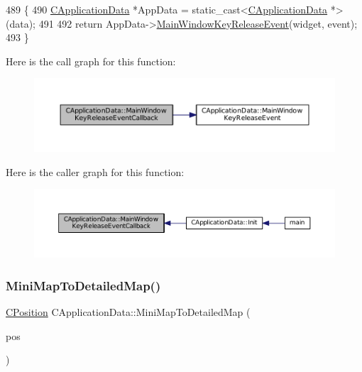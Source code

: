 \begin{DoxyCode}
489                                                                                                            
           \{
490     \hyperlink{classCApplicationData}{CApplicationData} *AppData = \textcolor{keyword}{static\_cast<}\hyperlink{classCApplicationData}{CApplicationData} *\textcolor{keyword}{>}(data);
491 
492     \textcolor{keywordflow}{return} AppData->\hyperlink{classCApplicationData_aff9f46bccd458a0dcca968e4a46c7d9b}{MainWindowKeyReleaseEvent}(widget, event);
493 \}
\end{DoxyCode}
Here is the call graph for this function\+:\nopagebreak
\begin{figure}[H]
\begin{center}
\leavevmode
\includegraphics[width=350pt]{classCApplicationData_a4b2c76db5c2efd75404502e36700f99b_cgraph}
\end{center}
\end{figure}
Here is the caller graph for this function\+:\nopagebreak
\begin{figure}[H]
\begin{center}
\leavevmode
\includegraphics[width=350pt]{classCApplicationData_a4b2c76db5c2efd75404502e36700f99b_icgraph}
\end{center}
\end{figure}
\hypertarget{classCApplicationData_a3dabde94ddec0eb2c732525f54164bc5}{}\label{classCApplicationData_a3dabde94ddec0eb2c732525f54164bc5} 
\subsubsection{\texorpdfstring{Mini\+Map\+To\+Detailed\+Map()}{MiniMapToDetailedMap()}}
{\footnotesize\ttfamily \hyperlink{classCPosition}{C\+Position} C\+Application\+Data\+::\+Mini\+Map\+To\+Detailed\+Map (\begin{DoxyParamCaption}\item[{const \hyperlink{classCPosition}{C\+Position} \&}]{pos }\end{DoxyParamCaption})\hspace{0.3cm}{\ttfamily [protected]}}



